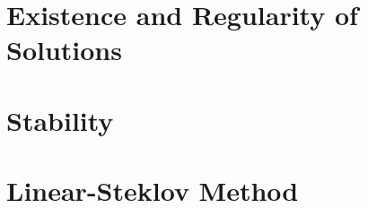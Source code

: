 \section{Existence and Regularity of Solutions}\label{appe.1}
	
\section{Stability}\label{appe.2}
	
\section{Linear-Steklov Method}\label{app:ls_method}
	
